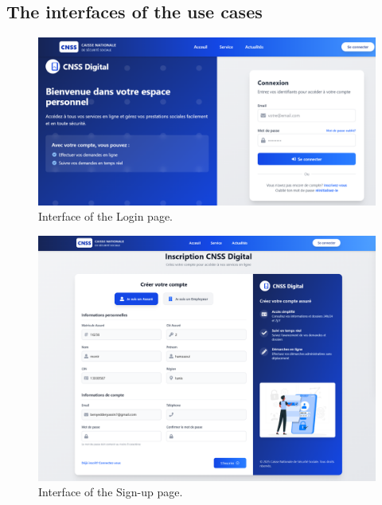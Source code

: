 \subsection{The interfaces of the use cases}
\begin{figure}[h!]
    \centering
    \includegraphics[width=1\textwidth]{figures/ui-auth.png}
    \caption{Interface of the Login page.}
\end{figure}
\begin{figure}[h!]
    \centering
    \includegraphics[width=1\textwidth]{figures/ui-signup.png}
    \caption{Interface of the Sign-up page.}
\end{figure}

